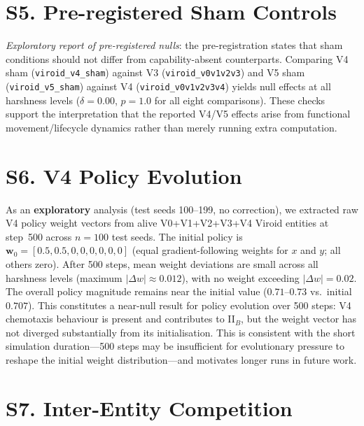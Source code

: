 \documentclass[letterpaper]{article}
\begin{document}
\section*{S5. Pre-registered Sham Controls}
\label{sec:s5}

\emph{Exploratory report of pre-registered nulls}: the pre-registration states
that sham conditions should not differ from capability-absent counterparts.
Comparing V4 sham (\texttt{viroid\_v4\_sham}) against V3
(\texttt{viroid\_v0v1v2v3}) and V5 sham (\texttt{viroid\_v5\_sham}) against V4
(\texttt{viroid\_v0v1v2v3v4}) yields null effects at all harshness levels
($\delta=0.00$, $p=1.0$ for all eight comparisons).
These checks support the interpretation that the reported V4/V5 effects arise
from functional movement/lifecycle dynamics rather than merely running extra
computation.

\section*{S6. V4 Policy Evolution}
\label{sec:s6}

As an \textbf{exploratory} analysis (test seeds 100--199, no correction),
we extracted raw V4 policy weight vectors from alive V0+V1+V2+V3+V4 Viroid
entities at step~500 across $n\!=\!100$ test seeds.
The initial policy is $\mathbf{w}_0 = [0.5, 0.5, 0, 0, 0, 0, 0, 0]$
(equal gradient-following weights for $x$ and $y$; all others zero).
After 500 steps, mean weight deviations are small across all harshness levels
(maximum $|\Delta w| \approx 0.012$), with no weight exceeding $|\Delta w| = 0.02$.
The overall policy magnitude remains near the initial value ($0.71$--$0.73$
vs.\ initial $0.707$).
This constitutes a near-null result for policy evolution over 500 steps:
V4 chemotaxis behaviour is present and contributes to II$_B$, but the
weight vector has not diverged substantially from its initialisation.
This is consistent with the short simulation duration---500 steps may be
insufficient for evolutionary pressure to reshape the initial weight
distribution---and motivates longer runs in future work.

\section*{S7. Inter-Entity Competition}
\label{sec:s7}
\end{document}
